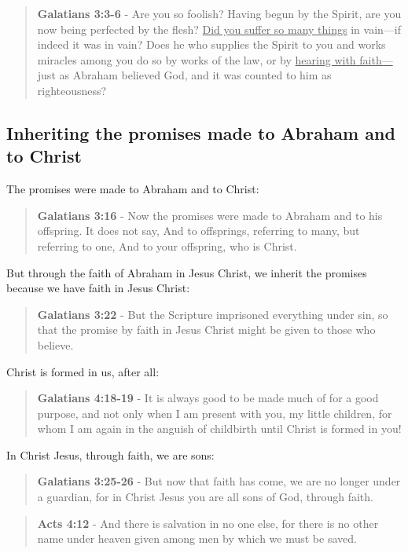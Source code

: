 \documentclass[11pt]{article}
\begin{document}
\begin{quote}
\textbf{Galatians 3:3-6} - Are you so foolish? Having begun by the Spirit, are you now being perfected by the flesh? \uline{Did you suffer so many things} in vain—if indeed it was in vain? Does he who supplies the Spirit to you and works miracles among you do so by works of the law, or by \uline{hearing with faith—} just as Abraham believed God, and it was counted to him as righteousness?
\end{quote}

\subsection{Inheriting the promises made to Abraham and to Christ}
\label{sec:orgd2d66a0}

The promises were made to Abraham and to Christ:

\begin{quote}
\textbf{Galatians 3:16} - Now the promises were made to Abraham and to his offspring. It does not say, And to offsprings, referring to many, but referring to one, And to your offspring, who is Christ.
\end{quote}

But through the faith of Abraham in Jesus Christ, we inherit the promises because we have faith in Jesus Christ:

\begin{quote}
\textbf{Galatians 3:22} - But the Scripture imprisoned everything under sin, so that the promise by faith in Jesus Christ might be given to those who believe.
\end{quote}

Christ is formed in us, after all:

\begin{quote}
\textbf{Galatians 4:18-19} - It is always good to be made much of for a good purpose, and not only when I am present with you, my little children, for whom I am again in the anguish of childbirth until Christ is formed in you!
\end{quote}

In Christ Jesus, through faith, we are sons:

\begin{quote}
\textbf{Galatians 3:25-26} - But now that faith has come, we are no longer under a guardian, for in Christ Jesus you are all sons of God, through faith.
\end{quote}

\begin{quote}
\textbf{Acts 4:12} - And there is salvation in no one else, for there is no other name under heaven given among men by which we must be saved.
\end{quote}
\end{document}

